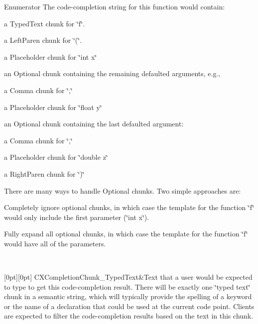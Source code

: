 \begin{DoxyEnumFields}{Enumerator}
The code-\/completion string for this function would contain\+:
\begin{DoxyItemize}
\item a Typed\+Text chunk for \char`\"{}f\char`\"{}.
\item a Left\+Paren chunk for \char`\"{}(\char`\"{}.
\item a Placeholder chunk for \char`\"{}int x\char`\"{}
\item an Optional chunk containing the remaining defaulted arguments, e.\+g.,
\begin{DoxyItemize}
\item a Comma chunk for \char`\"{},\char`\"{}
\item a Placeholder chunk for \char`\"{}float y\char`\"{}
\item an Optional chunk containing the last defaulted argument\+:
\begin{DoxyItemize}
\item a Comma chunk for \char`\"{},\char`\"{}
\item a Placeholder chunk for \char`\"{}double z\char`\"{}
\end{DoxyItemize}
\end{DoxyItemize}
\item a Right\+Paren chunk for \char`\"{})\char`\"{}
\end{DoxyItemize}

There are many ways to handle Optional chunks. Two simple approaches are\+:
\begin{DoxyItemize}
\item Completely ignore optional chunks, in which case the template for the function \char`\"{}f\char`\"{} would only include the first parameter (\char`\"{}int x\char`\"{}).
\item Fully expand all optional chunks, in which case the template for the function \char`\"{}f\char`\"{} would have all of the parameters. 
\end{DoxyItemize}\\
\hline

[0pt][0pt]{}\mbox{\label{group__CINDEX__CODE__COMPLET_gga82570056548565efdd6fc74e57e75bbda763659d4291d580f097f97a77ef90f61}} 
C\+X\+Completion\+Chunk\+\_\+\+Typed\+Text&Text that a user would be expected to type to get this code-\/completion result. There will be exactly one \char`\"{}typed text\char`\"{} chunk in a semantic string, which will typically provide the spelling of a keyword or the name of a declaration that could be used at the current code point. Clients are expected to filter the code-\/completion results based on the text in this chunk. \\
\hline


\end{DoxyEnumFields}
